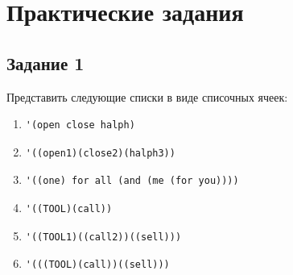 \documentclass[a4paper,oneside,14pt]{extarticle}
\begin{document}

\setcounter{page}{2}
\renewcommand{\contentsname}{СОДЕРЖАНИЕ}
\tableofcontents


\newpage
\section{Практические задания}

\subsection{Задание 1}

Представить следующие списки в виде списочных ячеек:

\begin{enumerate}
    \item \begin{lstlisting}[label={lst:}]
'(open close halph)
    \end{lstlisting}

    \item \begin{lstlisting}[label={lst:}]
'((open1)(close2)(halph3))
    \end{lstlisting}

    \item \begin{lstlisting}[label={lst:}]
'((one) for all (and (me (for you))))
    \end{lstlisting}

    \item \begin{lstlisting}[label={lst:}]
'((TOOL)(call))
    \end{lstlisting}

    \item \begin{lstlisting}[label={lst:}]
'((TOOL1)((call2))((sell)))
    \end{lstlisting}

    \item \begin{lstlisting}[label={lst:}]
'(((TOOL)(call))((sell)))
    \end{lstlisting}
\end{enumerate}
\end{document}

